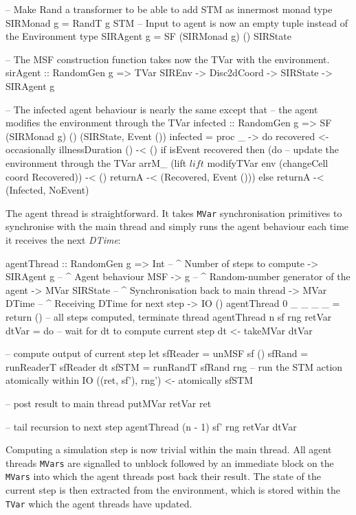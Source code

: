 \begin{HaskellCode}
-- Make Rand a transformer to be able to add STM as innermost monad
type SIRMonad g = RandT g STM
-- Input to agent is now an empty tuple instead of the Environment
type SIRAgent g = SF (SIRMonad g) () SIRState

-- The MSF construction function takes now the TVar with the environment.
sirAgent :: RandomGen g => TVar SIREnv -> Disc2dCoord -> SIRState -> SIRAgent g

-- The infected agent behaviour is nearly the same except that
-- the agent modifies the environment through the TVar
infected :: RandomGen g => SF (SIRMonad g) () (SIRState, Event ())
infected = proc _ -> do
  recovered <- occasionally illnessDuration () -< ()
  if isEvent recovered
    then (do
      -- update the environment through the TVar
      arrM_ (lift $ lift $ modifyTVar env (changeCell coord Recovered)) -< ()
      returnA -< (Recovered, Event ()))
    else returnA -< (Infected, NoEvent)
\end{HaskellCode}

The agent thread is straightforward. It takes \texttt{MVar} synchronisation primitives to synchronise with the main thread and simply runs the agent behaviour each time it receives the next \textit{DTime}:

\begin{HaskellCode}
agentThread :: RandomGen g 
            => Int             -- ^ Number of steps to compute
            -> SIRAgent g      -- ^ Agent behaviour MSF
            -> g               -- ^ Random-number generator of the agent
            -> MVar SIRState   -- ^ Synchronisation back to main thread
            -> MVar DTime      -- ^ Receiving DTime for next step
            -> IO ()
agentThread 0 _ _ _ _ = return () -- all steps computed, terminate thread
agentThread n sf rng retVar dtVar = do
  -- wait for dt to compute current step
  dt <- takeMVar dtVar

  -- compute output of current step
  let sfReader = unMSF sf ()
      sfRand   = runReaderT sfReader dt
      sfSTM    = runRandT sfRand rng
  -- run the STM action atomically within IO
  ((ret, sf'), rng') <- atomically sfSTM 

  -- post result to main thread
  putMVar retVar ret
  
  -- tail recursion to next step 
  agentThread (n - 1) sf' rng retVar dtVar
\end{HaskellCode}

Computing a simulation step is now trivial within the main thread. All agent threads \texttt{MVars} are signalled to unblock followed by an immediate block on the \texttt{MVars} into which the agent threads post back their result. The state of the current step is then extracted from the environment, which is stored within the \texttt{TVar} which the agent threads have updated.

